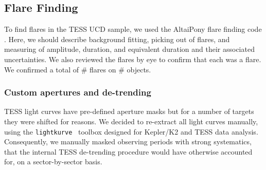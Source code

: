 \documentclass{aastex62}
\begin{document}
\subsection{Flare Finding}
\label{subsec:findflare}
To find flares in the TESS UCD sample, we used the AltaiPony flare finding code \citep[][in prep.]{Ilin2019,Ilin2020}. Here, we should describe background fitting, picking out of flares, and measuring of amplitude, duration, and equivalent duration and their associated uncertainties. We also reviewed the flares by eye to confirm that each was a flare. We confirmed a total of \# flares on \# objects. 
\subsubsection{Custom apertures and de-trending}
TESS light curves have pre-defined aperture masks but for a number of targets they were shifted for reasons. We decided to re-extract all light curves manually, using the \texttt{lightkurve}~\citep{lightkurve2019} toolbox designed for Kepler/K2 and TESS data analysis. Consequently, we manually masked observing periods with strong systematics, that the internal TESS de-trending procedure would have otherwise accounted for, on a sector-by-sector basis.
\end{document}
